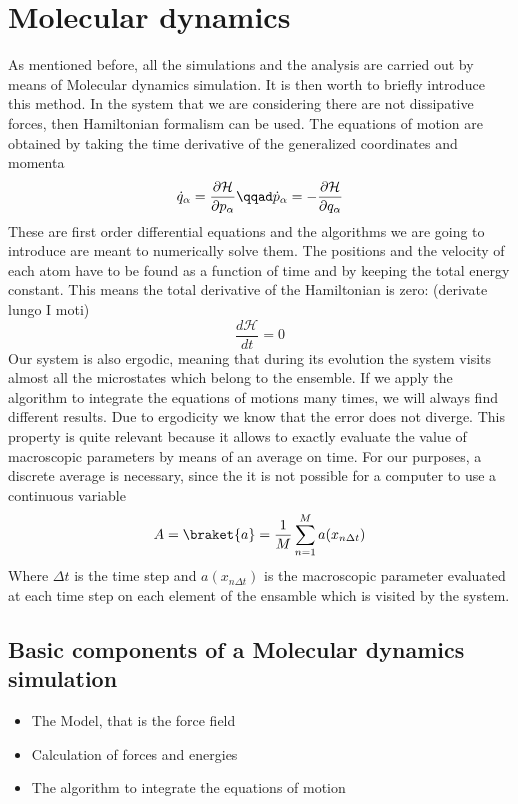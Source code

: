 \section{Molecular dynamics}
As mentioned before, all the simulations and the analysis are carried out by means of Molecular dynamics simulation. It is then worth to briefly introduce this method. In the system that we are considering there are not dissipative forces, then Hamiltonian formalism can be used. The equations of motion are obtained by taking the time derivative of the generalized coordinates and momenta
\begin{equation}
\dot{q}_{\alpha} = \frac{\partial \mathcal{H}}{\partial p_{\alpha}} \qqad \dot{p}_{\alpha} =- \frac{\partial \mathcal{H}}{\partial q_{\alpha}}
\end{equation}
These are first order differential equations and the algorithms we are going to introduce are meant to numerically solve them. The positions and the velocity of each atom have to be found as a function of time and by keeping the total energy constant. This means the total derivative of the Hamiltonian is zero: (derivate lungo I moti)
\begin{equation}
\frac{d \mathcal{H}}{dt} = 0 
\end{equation}
Our system is also ergodic, meaning that during its evolution the system visits almost all the microstates which belong to the ensemble. If we apply the algorithm to integrate the equations of motions many times, we will always find different results. Due to ergodicity we know that the error does not diverge. This property is quite relevant because it allows to exactly evaluate the value of macroscopic parameters by means of an average on time. For our purposes, a discrete average is necessary, since the it is not possible for a computer to use a continuous variable
\begin{equation}
A = \braket{a} = \frac{1}{M}\sum_{n=1}^{M} a(x_{n \Delta t})
\end{equation} 
Where $\Delta t$ is the time step and $ a(x_{n \Delta t})$ is the macroscopic parameter evaluated at each time step on each element of the ensamble which is visited by the system.
\subsection{Basic components of a Molecular dynamics simulation}
\begin{itemize}
\item The Model, that is the force field
\item Calculation of forces and energies
\item The algorithm to integrate the equations of motion
\end{itemize}
